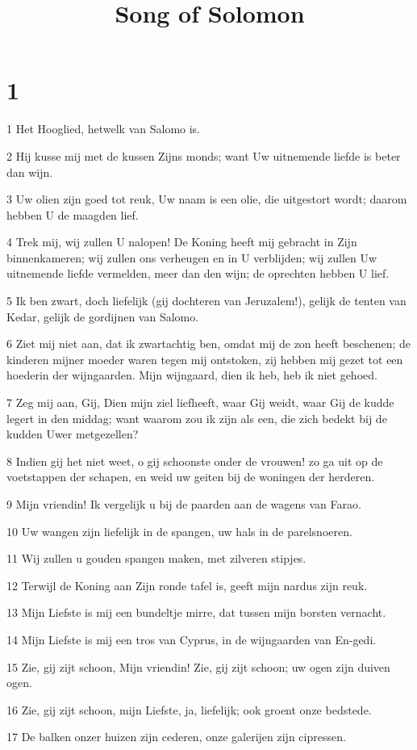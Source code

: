 

\title{Song of Solomon}



\chapter{1}

\par 1 Het Hooglied, hetwelk van Salomo is.
\par 2 Hij kusse mij met de kussen Zijns monds; want Uw uitnemende liefde is beter dan wijn.
\par 3 Uw olien zijn goed tot reuk, Uw naam is een olie, die uitgestort wordt; daarom hebben U de maagden lief.
\par 4 Trek mij, wij zullen U nalopen! De Koning heeft mij gebracht in Zijn binnenkameren; wij zullen ons verheugen en in U verblijden; wij zullen Uw uitnemende liefde vermelden, meer dan den wijn; de oprechten hebben U lief.
\par 5 Ik ben zwart, doch liefelijk (gij dochteren van Jeruzalem!), gelijk de tenten van Kedar, gelijk de gordijnen van Salomo.
\par 6 Ziet mij niet aan, dat ik zwartachtig ben, omdat mij de zon heeft beschenen; de kinderen mijner moeder waren tegen mij ontstoken, zij hebben mij gezet tot een hoederin der wijngaarden. Mijn wijngaard, dien ik heb, heb ik niet gehoed.
\par 7 Zeg mij aan, Gij, Dien mijn ziel liefheeft, waar Gij weidt, waar Gij de kudde legert in den middag; want waarom zou ik zijn als een, die zich bedekt bij de kudden Uwer metgezellen?
\par 8 Indien gij het niet weet, o gij schoonste onder de vrouwen! zo ga uit op de voetstappen der schapen, en weid uw geiten bij de woningen der herderen.
\par 9 Mijn vriendin! Ik vergelijk u bij de paarden aan de wagens van Farao.
\par 10 Uw wangen zijn liefelijk in de spangen, uw hals in de parelsnoeren.
\par 11 Wij zullen u gouden spangen maken, met zilveren stipjes.
\par 12 Terwijl de Koning aan Zijn ronde tafel is, geeft mijn nardus zijn reuk.
\par 13 Mijn Liefste is mij een bundeltje mirre, dat tussen mijn borsten vernacht.
\par 14 Mijn Liefste is mij een tros van Cyprus, in de wijngaarden van En-gedi.
\par 15 Zie, gij zijt schoon, Mijn vriendin! Zie, gij zijt schoon; uw ogen zijn duiven ogen.
\par 16 Zie, gij zijt schoon, mijn Liefste, ja, liefelijk; ook groent onze bedstede.
\par 17 De balken onzer huizen zijn cederen, onze galerijen zijn cipressen.

